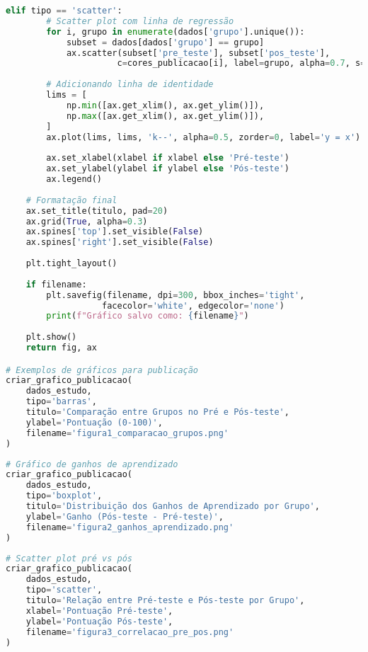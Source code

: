 \begin{pythonbox}
\begin{lstlisting}[language=Python]       
    elif tipo == 'scatter':
        # Scatter plot com linha de regressão
        for i, grupo in enumerate(dados['grupo'].unique()):
            subset = dados[dados['grupo'] == grupo]
            ax.scatter(subset['pre_teste'], subset['pos_teste'], 
                      c=cores_publicacao[i], label=grupo, alpha=0.7, s=50)
        
        # Adicionando linha de identidade
        lims = [
            np.min([ax.get_xlim(), ax.get_ylim()]),
            np.max([ax.get_xlim(), ax.get_ylim()]),
        ]
        ax.plot(lims, lims, 'k--', alpha=0.5, zorder=0, label='y = x')
        
        ax.set_xlabel(xlabel if xlabel else 'Pré-teste')
        ax.set_ylabel(ylabel if ylabel else 'Pós-teste')
        ax.legend()
    
    # Formatação final
    ax.set_title(titulo, pad=20)
    ax.grid(True, alpha=0.3)
    ax.spines['top'].set_visible(False)
    ax.spines['right'].set_visible(False)
    
    plt.tight_layout()
    
    if filename:
        plt.savefig(filename, dpi=300, bbox_inches='tight', 
                   facecolor='white', edgecolor='none')
        print(f"Gráfico salvo como: {filename}")
    
    plt.show()
    return fig, ax

# Exemplos de gráficos para publicação
criar_grafico_publicacao(
    dados_estudo, 
    tipo='barras',
    titulo='Comparação entre Grupos no Pré e Pós-teste',
    ylabel='Pontuação (0-100)',
    filename='figura1_comparacao_grupos.png'
)
\end{lstlisting}
\end{pythonbox}

\begin{pythonbox}
\begin{lstlisting}[language=Python]
# Gráfico de ganhos de aprendizado
criar_grafico_publicacao(
    dados_estudo,
    tipo='boxplot', 
    titulo='Distribuição dos Ganhos de Aprendizado por Grupo',
    ylabel='Ganho (Pós-teste - Pré-teste)',
    filename='figura2_ganhos_aprendizado.png'
)
\end{lstlisting}
\end{pythonbox}

\begin{pythonbox}
\begin{lstlisting}[language=Python]
# Scatter plot pré vs pós
criar_grafico_publicacao(
    dados_estudo,
    tipo='scatter',
    titulo='Relação entre Pré-teste e Pós-teste por Grupo', 
    xlabel='Pontuação Pré-teste',
    ylabel='Pontuação Pós-teste',
    filename='figura3_correlacao_pre_pos.png'
)
\end{lstlisting}
\end{pythonbox}

